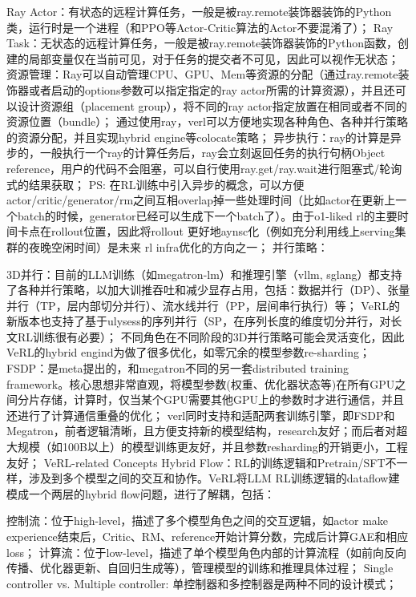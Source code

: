 \documentclass{pkuthesis}
\begin{document}
Ray Actor：有状态的远程计算任务，一般是被ray.remote装饰器装饰的Python类，运行时是一个进程（和PPO等Actor-Critic算法的Actor不要混淆了）；
Ray Task：无状态的远程计算任务，一般是被ray.remote装饰器装饰的Python函数，创建的局部变量仅在当前可见，对于任务的提交者不可见，因此可以视作无状态；
资源管理：Ray可以自动管理CPU、GPU、Mem等资源的分配（通过ray.remote装饰器或者启动的options参数可以指定指定的ray actor所需的计算资源），并且还可以设计资源组（placement group），将不同的ray actor指定放置在相同或者不同的资源位置（bundle）；
通过使用ray，verl可以方便地实现各种角色、各种并行策略的资源分配，并且实现hybrid engine等colocate策略；
异步执行：ray的计算是异步的，一般执行一个ray的计算任务后，ray会立刻返回任务的执行句柄Object reference，用户的代码不会阻塞，可以自行使用ray.get/ray.wait进行阻塞式/轮询式的结果获取；
PS: 在RL训练中引入异步的概念，可以方便actor/critic/generator/rm之间互相overlap掉一些处理时间（比如actor在更新上一个batch的时候，generator已经可以生成下一个batch了）。由于o1-liked rl的主要时间卡点在rollout位置，因此将rollout 更好地aynsc化（例如充分利用线上serving集群的夜晚空闲时间）是未来 rl infra优化的方向之一；
并行策略：

3D并行：目前的LLM训练（如megatron-lm）和推理引擎（vllm, sglang）都支持了各种并行策略，以加大训推吞吐和减少显存占用，包括：数据并行（DP）、张量并行（TP，层内部切分并行）、流水线并行（PP，层间串行执行）等；
VeRL的新版本也支持了基于ulysess的序列并行（SP，在序列长度的维度切分并行，对长文RL训练很有必要）；
不同角色在不同阶段的3D并行策略可能会灵活变化，因此VeRL的hybrid engind为做了很多优化，如零冗余的模型参数re-sharding；
FSDP：是meta提出的，和megatron不同的另一套distributed training framework。核心思想非常直观，将模型参数(权重、优化器状态等)在所有GPU之间分片存储，计算时，仅当某个GPU需要其他GPU上的参数时才进行通信，并且还进行了计算通信重叠的优化；
verl同时支持和适配两套训练引擎，即FSDP和Megatron，前者逻辑清晰，且方便支持新的模型结构，research友好；而后者对超大规模（如100B以上）的模型训练更友好，并且参数resharding的开销更小，工程友好；
VeRL-related Concepts
Hybrid Flow：RL的训练逻辑和Pretrain/SFT不一样，涉及到多个模型之间的交互和协作。VeRL将LLM RL训练逻辑的dataflow建模成一个两层的hybrid flow问题，进行了解耦，包括：

控制流：位于high-level，描述了多个模型角色之间的交互逻辑，如actor make experience结束后，Critic、RM、reference开始计算分数，完成后计算GAE和相应loss；
计算流：位于low-level，描述了单个模型角色内部的计算流程（如前向反向传播、优化器更新、自回归生成等），管理模型的训练和推理具体过程；
Single controller vs. Multiple controller: 单控制器和多控制器是两种不同的设计模式；
\end{document}

